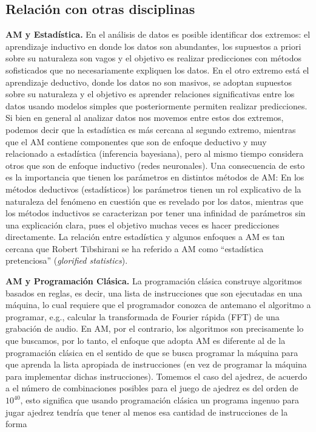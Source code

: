 \subsection{Relación con otras disciplinas}

\textbf{AM y Estadística.} En el análisis de datos es posible identificar dos extremos: el aprendizaje inductivo en donde los datos son abundantes, los supuestos a priori sobre su naturaleza son vagos y el objetivo es realizar predicciones con métodos sofisticados que no necesariamente expliquen los datos. En el otro extremo está el aprendizaje deductivo, donde los datos no son masivos, se adoptan supuestos sobre su naturaleza y el objetivo es aprender relaciones significativas entre los datos usando modelos simples que posteriormente permiten realizar predicciones. Si bien en general al analizar datos nos movemos entre estos dos extremos, podemos decir que la estadística es más cercana al segundo extremo, mientras que el AM contiene componentes que son de enfoque deductivo y muy relacionado a estadística (inferencia bayesiana), pero al mismo tiempo considera otros que son de enfoque inductivo (redes neuronales). Una consecuencia de esto es la importancia que tienen los parámetros en distintos métodos de AM: En los métodos deductivos (estadísticos) los parámetros tienen un rol explicativo de la naturaleza del fenómeno en cuestión que es revelado por los datos, mientras que los métodos inductivos se caracterizan por tener una infinidad de parámetros sin una explicación clara, pues el objetivo muchas veces es hacer predicciones directamente. La relación entre estadística y algunos enfoques a AM es tan cercana que Robert Tibshirani se ha referido a AM como ``estadística pretenciosa'' (\emph{glorified statistics}).

\textbf{AM y Programación Clásica.} La programación clásica construye algoritmos basados en reglas, es decir, una lista de instrucciones que son ejecutadas en una máquina, lo cual requiere que el programador conozca de antemano el algoritmo a programar, e.g., calcular la transformada de Fourier rápida (FFT) de una grabación de audio. En AM, por el contrario, los algoritmos son precisamente lo que buscamos, por lo tanto, el enfoque que adopta AM es diferente al de la programación clásica en el sentido de que se busca programar la máquina para que aprenda la lista apropiada de instrucciones (en vez de programar la máquina para implementar dichas instrucciones). Tomemos el caso del ajedrez, de acuerdo a \cite{shannon_1950} el número de combinaciones posibles para el juego de ajedrez es del orden de $10^40$, esto significa que usando programación clásica un programa ingenuo para jugar ajedrez tendría que tener al menos esa cantidad de instrucciones de la forma 

